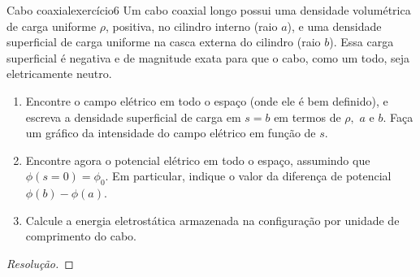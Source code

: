 \begin{exercício}{Cabo coaxial}{exercício6}
    Um cabo coaxial longo possui uma densidade volumétrica de carga uniforme \(\rho\), positiva, no cilindro interno (raio \(a\)), e uma densidade superficial de carga uniforme na casca externa do cilindro (raio \(b\)). Essa carga superficial é negativa e de magnitude exata para que o cabo, como um todo, seja eletricamente neutro.
    \begin{enumerate}[label=(\alph*)]
        \item Encontre o campo elétrico em todo o espaço (onde ele é bem definido), e escreva a densidade superficial de carga em \(s = b\) em termos de \(\rho,\) \(a\) e \(b\). Faça um gráfico da intensidade do campo elétrico em função de \(s\).
        \item Encontre agora o potencial elétrico em todo o espaço, assumindo que \(\phi(s = 0) = \phi_0\). Em particular, indique o valor da diferença de potencial \(\phi(b) - \phi(a)\).
        \item Calcule a energia eletrostática armazenada na configuração por unidade de comprimento do cabo.
\end{enumerate}
\end{exercício}
\begin{proof}[Resolução]

\end{proof}
